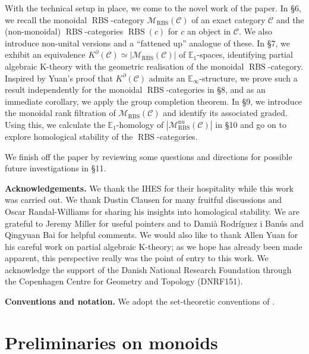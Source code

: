 \documentclass[12pt, reqno]{amsart}
\theoremstyle{plain}
\theoremstyle{definition}
\begin{document}
With the technical setup in place, we come to the novel work of the paper. In \S 6, we recall the monoidal $\operatorname{RBS}$-category $\mathscr{M}_{\operatorname{RBS}}(\mathcal{C})$ of an exact category $\mathcal{C}$ and the (non-monoidal) $\operatorname{RBS}$-categories $\operatorname{RBS}(c)$ for $c$ an object in $\mathcal{C}$. We also introduce non-unital versions and a ``fattened up'' analogue of these. In \S 7, we exhibit an equivalence $K^\partial(\mathcal{C})\simeq |\mathscr{M}_{\operatorname{RBS}}(\mathcal{C})|$ of $\mathbb{E}_1$-spaces, identifying partial algebraic K-theory with the geometric realisation of the monoidal $\operatorname{RBS}$-category. Inspired by Yuan's proof that $K^\partial(\mathcal{C})$ admits an $\mathbb{E}_\infty$-structure, we prove such a result independently for the monoidal $\operatorname{RBS}$-categories in \S 8, and as an immediate corollary, we apply the group completion theorem. In \S 9, we introduce the monoidal rank filtration of $\mathscr{M}_{\operatorname{RBS}}(\mathcal{C})$ and identify its associated graded. Using this, we calculate the $\mathbb{E}_1$-homology of $|\mathscr{M}_{\operatorname{RBS}}^{\operatorname{nu}}(\mathcal{C})|$ in \S 10 and go on to explore homological stability of the $\operatorname{RBS}$-categories.

We finish off the paper by reviewing some questions and directions for possible future investigations in \S 11.


\medskip

\textbf{Acknowledgements.} We thank the IHES for their hospitality while this work was carried out. We thank Dustin Clausen for many fruitful discussions and Oscar Randal-Williams for sharing his insights into homological stability. We are grateful to Jeremy Miller for useful pointers and to Damià Rodríguez i Banús and Qingyuan Bai for helpful comments. We would also like to thank Allen Yuan for his careful work on partial algebraic K-theory; as we hope has already been made apparent, this perspective really was the point of entry to this work. We acknowledge the support of the Danish National Research Foundation through the Copenhagen Centre for Geometry and Topology (DNRF151).

\medskip

\textbf{Conventions and notation.} We adopt the set-theoretic conventions of \cite[\S 1.2.15]{LurieHTT}.


\section{Preliminaries on monoids}
\end{document}
